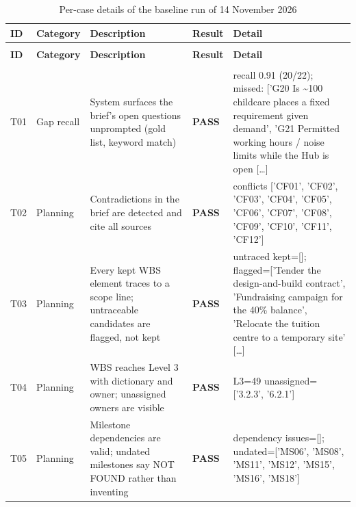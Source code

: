 {\footnotesize
\setlength{\tabcolsep}{3pt}
\renewcommand{\arraystretch}{1.15}
\begin{longtable}{@{}>{\raggedright\arraybackslash}p{0.75cm}>{\raggedright\arraybackslash}p{1.9cm}>{\raggedright\arraybackslash}p{4.2cm}>{\raggedright\arraybackslash}p{1.0cm}>{\raggedright\arraybackslash}p{6.9cm}@{}}
\caption{Per-case details of the baseline run of 14 November 2026}\label{tab:appcases}\\
\toprule
\textbf{ID} & \textbf{Category} & \textbf{Description} & \textbf{Result} & \textbf{Detail} \\
\midrule
\endfirsthead
\multicolumn{5}{@{}l}{\small\itshape Table~\thetable\ continued} \\
\toprule
\textbf{ID} & \textbf{Category} & \textbf{Description} & \textbf{Result} & \textbf{Detail} \\
\midrule
\endhead
\midrule
\multicolumn{5}{r@{}}{\small\itshape continued on next page} \\
\endfoot
\bottomrule
\endlastfoot
T01 & Gap recall & System surfaces the brief's open questions unprompted (gold list, keyword match) & \textbf{PASS} & {\ttfamily recall 0.91 (20/\allowbreak{}22); missed: ['G20 Is \textasciitilde{}100 childcare places a fixed requirement given demand',\allowbreak{} 'G21 Permitted working hours /\allowbreak{} noise limits while the Hub is open} [\ldots] \\
T02 & Planning & Contradictions in the brief are detected and cite all sources & \textbf{PASS} & {\ttfamily conflicts ['CF01',\allowbreak{} 'CF02',\allowbreak{} 'CF03',\allowbreak{} 'CF04',\allowbreak{} 'CF05',\allowbreak{} 'CF06',\allowbreak{} 'CF07',\allowbreak{} 'CF08',\allowbreak{} 'CF09',\allowbreak{} 'CF10',\allowbreak{} 'CF11',\allowbreak{} 'CF12']} \\
T03 & Planning & Every kept WBS element traces to a scope line; untraceable candidates are flagged, not kept & \textbf{PASS} & {\ttfamily untraced kept=\allowbreak{}[]; flagged=\allowbreak{}['Tender the design-and-build contract',\allowbreak{} 'Fundraising campaign for the 40\% balance',\allowbreak{} 'Relocate the tuition centre to a temporary site'} [\ldots] \\
T04 & Planning & WBS reaches Level 3 with dictionary and owner; unassigned owners are visible & \textbf{PASS} & {\ttfamily L3=\allowbreak{}49 unassigned=\allowbreak{}['3.2.3',\allowbreak{} '6.2.1']} \\
T05 & Planning & Milestone dependencies are valid; undated milestones say NOT FOUND rather than inventing & \textbf{PASS} & {\ttfamily dependency issues=\allowbreak{}[]; undated=\allowbreak{}['MS06',\allowbreak{} 'MS08',\allowbreak{} 'MS11',\allowbreak{} 'MS12',\allowbreak{} 'MS15',\allowbreak{} 'MS16',\allowbreak{} 'MS18']} \\

\end{longtable}}
